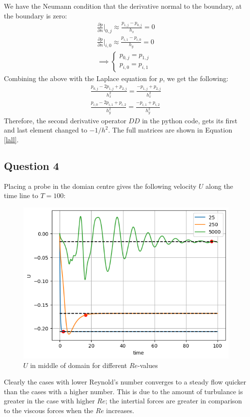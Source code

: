 \documentclass[10pt]{report}
\newcommand{\p}{\partial}
\begin{document}
We have the Neumann condition that the derivative normal to the boundary, at the boundary is zero:
\begin{gather*}
    \frac{\p p}{\p n}\vert_{0,j} \approx \frac{p_{1,j}-p_{0,j}}{h_x} = 0\\
    \frac{\p p}{\p n}\vert_{i,0} \approx \frac{p_{i,1}-p_{i,0}}{h_y} = 0\\
    \implies \begin{cases}
        p_{0,j} = p_{1,j}\\
        p_{i,0} = p_{i,1}
    \end{cases}
\end{gather*}
Combining the above with the Laplace equation for $p$, we get the following:
\begin{gather*}
    \frac{p_{0,j}-2p_{1,j}+p_{2,j}}{h_x^2} = \frac{-p_{1,j}+p_{2,j}}{h_x^2}\\
    \frac{p_{i,0}-2p_{i,1}+p_{i,2}}{h_y^2} = \frac{-p_{i,1}+p_{i,2}}{h_y^2}
\end{gather*}
Therefore, the second derivative operator $DD$ in the python code, gets its first and last element changed to
$-1/h^2$. The full matrices are shown in Equation \ref{lall}.

\subsection*{Question 4}
Placing a probe in the domian centre gives the following velocity $U$ along the time line to $T = 100$:
\begin{figure}[H]
    \centering
    \includegraphics[width = \textwidth]{plots/plot1.png}
    \caption{$U$ in middle of domain for different $Re$-values}
    \label{plot1}
\end{figure}
Clearly the cases with lower Reynold's number converges to a steady flow quicker than the cases with
a higher number. This is due to the amount of turbulance is greater in the case with higher $Re$; 
the intertial forces are greater in comparison to the viscous forces when the $Re$ increases.
\end{document}
